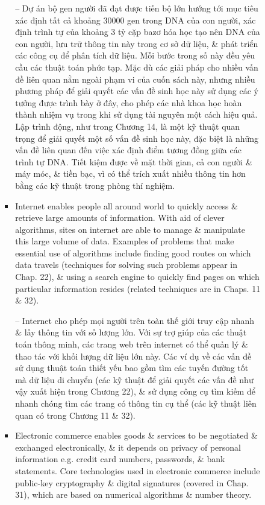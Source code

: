 \documentclass{article}
\begin{document}
\begin{itemize}
\begin{itemize}
\begin{itemize}
\begin{itemize}
                -- Dự án bộ gen người đã đạt được tiến bộ lớn hướng tới mục tiêu xác định tất cả khoảng 30000 gen trong DNA của con người, xác định trình tự của khoảng 3 tỷ cặp bazơ hóa học tạo nên DNA của con người, lưu trữ thông tin này trong cơ sở dữ liệu, \& phát triển các công cụ để phân tích dữ liệu. Mỗi bước trong số này đều yêu cầu các thuật toán phức tạp. Mặc dù các giải pháp cho nhiều vấn đề liên quan nằm ngoài phạm vi của cuốn sách này, nhưng nhiều phương pháp để giải quyết các vấn đề sinh học này sử dụng các ý tưởng được trình bày ở đây, cho phép các nhà khoa học hoàn thành nhiệm vụ trong khi sử dụng tài nguyên một cách hiệu quả. Lập trình động, như trong Chương 14, là một kỹ thuật quan trọng để giải quyết một số vấn đề sinh học này, đặc biệt là những vấn đề liên quan đến việc xác định điểm tương đồng giữa các trình tự DNA. Tiết kiệm được về mặt thời gian, cả con người \& máy móc, \& tiền bạc, vì có thể trích xuất nhiều thông tin hơn bằng các kỹ thuật trong phòng thí nghiệm.
                \item Internet enables people all around world to quickly access \& retrieve large amounts of information. With aid of clever algorithms, sites on internet are able to manage \& manipulate this large volume of data. Examples of problems that make essential use of algorithms include finding good routes on which data travels (techniques for solving such problems appear in Chap. 22), \& using a search engine to quickly find pages on which particular information resides (related techniques are in Chaps. 11 \& 32).
                
                -- Internet cho phép mọi người trên toàn thế giới truy cập nhanh \& lấy thông tin với số lượng lớn. Với sự trợ giúp của các thuật toán thông minh, các trang web trên internet có thể quản lý \& thao tác với khối lượng dữ liệu lớn này. Các ví dụ về các vấn đề sử dụng thuật toán thiết yếu bao gồm tìm các tuyến đường tốt mà dữ liệu di chuyển (các kỹ thuật để giải quyết các vấn đề như vậy xuất hiện trong Chương 22), \& sử dụng công cụ tìm kiếm để nhanh chóng tìm các trang có thông tin cụ thể (các kỹ thuật liên quan có trong Chương 11 \& 32).
                \item Electronic commerce enables goods \& services to be negotiated \& exchanged electronically, \& it depends on privacy of personal information e.g. credit card numbers, passwords, \& bank statements. Core technologies used in electronic commerce include public-key cryptography \& digital signatures (covered in Chap. 31), which are based on numerical algorithms \& number theory.
                

\end{itemize}
\end{itemize}
\end{itemize}
\end{itemize}
\end{document}
